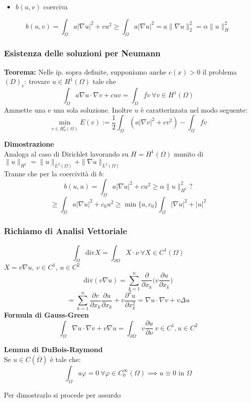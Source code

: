 \documentclass[a4paper]{article}
\begin{document}
\begin{itemize}
	\item $b(u,v)$ coerciva

\end{itemize}
\[b(u,v)=\int_{\Omega}^{} a|\nabla u|^2+cu^2\ge \int_{\Omega}^{} a|\nabla u|^2=a\|\nabla u\|_2^2=\alpha \|u\|^2_H  \]

\subsubsection{Esistenza delle soluzioni per Neumann}
\begin{tcolorbox}
	\textbf{Teorema: }Nelle ip. sopra definite, supponiamo anche $c(x)>0$ il problema $(D)_v$: trovare $u\in H^1(\Omega)$ tale che
	\[\int_{\Omega}^{} a\nabla u\cdot \nabla v+cuv=\int_{\Omega}^{} fv\ \forall v\in H^1(\Omega)\]
	Ammette una e una sola soluzione. Inoltre $u$ è caratterizzata nel modo seguente:
	\[\min_{v\in H_0^1(\Omega)}E(v):=\frac{1}{2}\int_{\Omega}^{} (a|\nabla v|^2+cv^2)-\int_{\Omega}^{} fv\]

\end{tcolorbox}
\textbf{Dimostrazione} 
\\Analoga al caso di Dirichlet lavorando su $H=H^1(\Omega)$ munito di $\|u\|_{H^1}=\|u\|_{L^{2}(\Omega)}+\|\nabla u\|_{L^{2}(\Omega)}$
\\Tranne che per la coercività di $b$:
\[b(u,u)=\int_{\Omega}^{} a|\nabla u|^2+cu^2\ge \alpha\|u\|_{H^1}^2?\]
\[\ge \int_{\Omega}^{} a|\nabla u|^2+c_0u^2\ge \min \{a,c_0\} \int_{\Omega}^{} |\nabla u|^2+|u|^2\]
\subsubsection{Richiamo di Analisi Vettoriale}
\[\int_{\Omega}^{} \text{div}X=\int_{\partial \Omega}^{} X\cdot \nu \ \forall X\in C^1(\Omega)\]
$X=v\nabla u$, $v\in C^1$, $u\in C^2$
\[\text{div}(v\nabla u)=\sum_{k=1}^{n} \frac{\partial }{\partial x_k} \bigg(v \frac{\partial u}{\partial x_k} \bigg)\]\[=\sum_{k=1}^{n} \frac{\partial v}{\partial x_k} \frac{\partial u}{\partial x_k} +v \frac{\partial ^2u}{\partial x_k^2} =\nabla u\cdot \nabla v+v\Delta u\]
\textbf{Formula di Gauss-Green}
\[\int_{\Omega}^{} \nabla u\cdot \nabla v+v\nabla u=\int_{\partial \Omega}^{} v \frac{\partial u}{\partial \nu} \ v\in C^1,u\in C^2\]

\begin{tcolorbox}
\textbf{Lemma di DuBois-Raymond}
\\Se $u\in C(\overline{\Omega})$ è tale che:
\[\int_{\Omega}^{} u\varphi=0\ \forall \varphi\in C_0^\infty(\Omega)\implies u\equiv0\text{ in }\Omega\] 
\end{tcolorbox}
Per dimostrarlo si procede per assurdo
\end{document}
